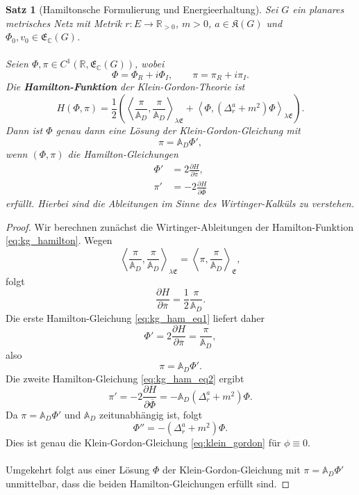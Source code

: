 \documentclass[11pt,a4paper,leqno]{report}
\newtheorem{proposition}{Satz}[chapter]
\numberwithin{equation}{chapter}
\begin{document}
\begin{proposition}[Hamiltonsche Formulierung und Energieerhaltung]
	\label{prop:kg_hamilton}
	Sei \(G\) ein planares metrisches Netz mit Metrik 
	\(r:E\to\mathbb{R}_{>0}\), \(m>0\), \(a\in\mathfrak{K}(G)\) und 
	\(\Phi_0,v_0\in\mathfrak{E}_{\mathbb C}(G)\). 
	\\
	\\
	Seien \(\Phi,\pi\in C^1(\mathbb{R},\mathfrak{E}_{\mathbb C}(G))\), wobei
	\[
	\Phi=\Phi_R+i\Phi_I,
	\qquad
	\pi=\pi_R+i\pi_I.
	\]
	Die \textbf{Hamilton-Funktion} der Klein-Gordon-Theorie ist
	\begin{equation}\label{eq:kg_hamilton}
		H(\Phi,\pi)
		=
		\frac12\left(
		\left\langle\frac{\pi}{\mathbb A_D},
		\frac{\pi}{\mathbb A_D}\right\rangle_{\lambda\mathfrak E}
		+
		\left\langle\Phi,(\Delta_r^a+m^2)\Phi\right\rangle_{\lambda\mathfrak E}
		\right).
	\end{equation}
	Dann ist \(\Phi\) genau dann eine Lösung der Klein-Gordon-Gleichung mit
	\[
	\pi=\mathbb A_D\Phi',
	\]
	wenn \((\Phi,\pi)\) die Hamilton-Gleichungen
	\begin{align}
		\Phi' &= 2\frac{\partial H}{\partial\overline\pi},
		\label{eq:kg_ham_eq1}\\
		\pi' &= -2\frac{\partial H}{\partial\overline\Phi}
		\label{eq:kg_ham_eq2}
	\end{align}
	erfüllt.
	Hierbei sind die Ableitungen im Sinne des Wirtinger-Kalküls zu verstehen.
\end{proposition}
\begin{proof}
	Wir berechnen zunächst die Wirtinger-Ableitungen der Hamilton-Funktion 
	\eqref{eq:kg_hamilton}. Wegen
	\[
	\left\langle\frac{\pi}{\mathbb A_D},
	\frac{\pi}{\mathbb A_D}\right\rangle_{\lambda\mathfrak E}
	=
	\left\langle\pi,
	\frac{\pi}{\mathbb A_D}\right\rangle_{\mathfrak E},
	\]
	folgt
	\[
	\frac{\partial H}{\partial\overline\pi}
	=
	\frac12\frac{\pi}{\mathbb A_D}.
	\]
	Die erste Hamilton-Gleichung \eqref{eq:kg_ham_eq1} liefert daher
	\[
	\Phi'
	=
	2\frac{\partial H}{\partial\overline\pi}
	=
	\frac{\pi}{\mathbb A_D},
	\]
	also
	\[
	\pi=\mathbb A_D\Phi'.
	\]
	Die zweite Hamilton-Gleichung \eqref{eq:kg_ham_eq2} ergibt
	\[
	\pi'
	=
	-2\frac{\partial H}{\partial\overline\Phi}
	=
	-\mathbb{A}_D(\Delta_r^a+m^2)\Phi.
	\]
	Da \(\pi=\mathbb A_D\Phi'\) und \(\mathbb A_D\) zeitunabhängig ist, folgt
	\[
	\Phi''
	=
	-(\Delta_r^a+m^2)\Phi.
	\]
	Dies ist genau die Klein-Gordon-Gleichung \eqref{eq:klein_gordon} für \(\phi\equiv0\).
	\\
	\\
	Umgekehrt folgt aus einer Lösung \(\Phi\) der Klein-Gordon-Gleichung mit 
	\(\pi=\mathbb A_D\Phi'\) unmittelbar, dass die beiden Hamilton-Gleichungen 
	erfüllt sind.
\end{proof}
\end{document}
